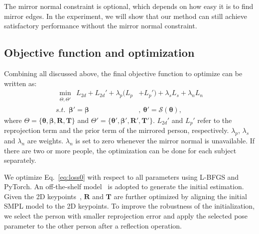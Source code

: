 The mirror normal constraint is optional, which depends on how easy it is to find mirror edges. In the experiment, we will show that our method can still achieve satisfactory performance without the mirror normal constraint.

\subsection{Objective function and optimization}
\label{sec:opt}
Combining all discussed above, the final objective function to optimize can be written as:
\begin{equation}
\label{eq:loss0}
\begin{split}
    \min_{\substack{\Theta, \Theta'}}~L_{2d}+L_{2d}' + \lambda_p (L_{p}&+L_{p}') + \lambda_s L_s + \lambda_n L_n \\
     s.t.~~ \bm{\beta}' = \bm{\beta}&, ~\bm{\theta}' = \mathcal{S}(\bm \theta),
\end{split}
\end{equation}
where $\Theta=\{\bm\theta, \bm\beta, \bm R, \bm T\}$ and $\Theta'=\{\bm\theta', \bm\beta', \bm R', \bm T'\}$. $L_{2d}'$ and $L_p'$ refer to the reprojection term and the prior term of the mirrored person, respectively. $\lambda_p$, $\lambda_s$ and $\lambda_n$ are weights. $\lambda_n$ is set to zero whenever the mirror normal is unavailable. If there are two or more people, the optimization can be done for each subject separately.

We optimize Eq.~\ref{eq:loss0} with respect to all parameters using L-BFGS and PyTorch. An off-the-shelf model~\cite{kolotouros2019spin} is adopted to generate the initial estimation. Given the 2D keypoints~\cite{sun2019deep, cao2017realtime}, $\bm R$ and $\bm T$ are further optimized by aligning the initial SMPL model to the 2D keypoints. To improve the robustness of the initialization, we select the person with smaller reprojection error and apply the selected pose parameter to the other person after a reflection operation. 
























































